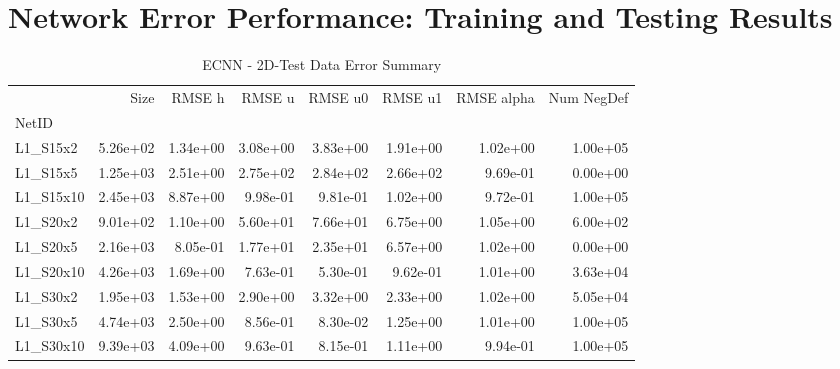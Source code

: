 \documentclass{article}
\theoremstyle{remark}
\numberwithin{equation}{subsection}
\begin{document}
\section{Network Error Performance: Training and Testing Results}


\begin{table}[H]

\begin{tabular}{lrrrrrrr}
	\toprule
	{} &     Size &   RMSE h &   RMSE u &  RMSE u0 &  RMSE u1 &  RMSE alpha &  Num NegDef \\
	NetID     &          &          &          &          &          &             &             \\
	\midrule
	L1\_S15x2  & 5.26e+02 & 1.34e+00 & 3.08e+00 & 3.83e+00 & 1.91e+00 &    1.02e+00 &    1.00e+05 \\
	L1\_S15x5  & 1.25e+03 & 2.51e+00 & 2.75e+02 & 2.84e+02 & 2.66e+02 &    9.69e-01 &    0.00e+00 \\
	L1\_S15x10 & 2.45e+03 & 8.87e+00 & 9.98e-01 & 9.81e-01 & 1.02e+00 &    9.72e-01 &    1.00e+05 \\
	L1\_S20x2  & 9.01e+02 & 1.10e+00 & 5.60e+01 & 7.66e+01 & 6.75e+00 &    1.05e+00 &    6.00e+02 \\
	L1\_S20x5  & 2.16e+03 & 8.05e-01 & 1.77e+01 & 2.35e+01 & 6.57e+00 &    1.02e+00 &    0.00e+00 \\
	L1\_S20x10 & 4.26e+03 & 1.69e+00 & 7.63e-01 & 5.30e-01 & 9.62e-01 &    1.01e+00 &    3.63e+04 \\
	L1\_S30x2  & 1.95e+03 & 1.53e+00 & 2.90e+00 & 3.32e+00 & 2.33e+00 &    1.02e+00 &    5.05e+04 \\
	L1\_S30x5  & 4.74e+03 & 2.50e+00 & 8.56e-01 & 8.30e-02 & 1.25e+00 &    1.01e+00 &    1.00e+05 \\
	L1\_S30x10 & 9.39e+03 & 4.09e+00 & 9.63e-01 & 8.15e-01 & 1.11e+00 &    9.94e-01 &    1.00e+05 \\
	\bottomrule
\end{tabular}
\caption{ECNN - 2D-Test Data Error Summary}
\end{table}
\end{document}
